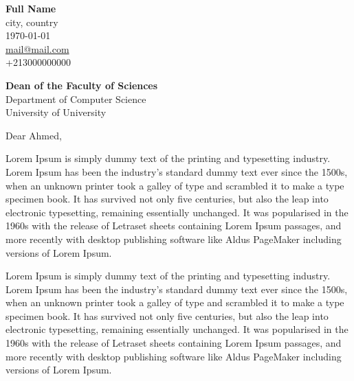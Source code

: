\documentclass[a4paper,12pt]{article}
\begin{document}
\begin{titlepage}

    \begin{minipage}[t]{0.95\textwidth}
        \hfill
        \raggedleft
        \textbf{Full Name } \\
        city, country \\
        \today\\
        \href{mailto:mail@mail.com}{mail@mail.com} \\
        +213000000000 \\
    \end{minipage}

\raggedright \textbf{Dean of the Faculty of Sciences} \\ Department of Computer Science \\  University of University \\  

\vspace{0.7em}

\raggedright Dear Ahmed,\\

\vspace{0.7em}

Lorem Ipsum is simply dummy text of the printing and typesetting industry. Lorem Ipsum has been the industry's standard dummy text ever since the 1500s, when an unknown printer took a galley of type and scrambled it to make a type specimen book. It has survived not only five centuries, but also the leap into electronic typesetting, remaining essentially unchanged. It was popularised in the 1960s with the release of Letraset sheets containing Lorem Ipsum passages, and more recently with desktop publishing software like Aldus PageMaker including versions of Lorem Ipsum.

\vspace{0.7em}

Lorem Ipsum is simply dummy text of the printing and typesetting industry. Lorem Ipsum has been the industry's standard dummy text ever since the 1500s, when an unknown printer took a galley of type and scrambled it to make a type specimen book. It has survived not only five centuries, but also the leap into electronic typesetting, remaining essentially unchanged. It was popularised in the 1960s with the release of Letraset sheets containing Lorem Ipsum passages, and more recently with desktop publishing software like Aldus PageMaker including versions of Lorem Ipsum.\vspace{0.7em}


\end{titlepage}
\end{document}
